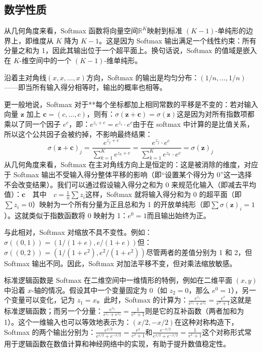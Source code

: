\subsection{数学性质}
从几何角度来看，Softmax 函数将向量空间$\mathbb{R}^K$映射到标准 $(K - 1)$-单纯形的边界上，即维度从 $K$ 降为 $K - 1$。这是因为 Softmax 输出满足一个线性约束：所有分量之和为 1，因此其输出位于一个超平面上。换句话说，Softmax 的值域是嵌入在 $K$-维空间中的一个 $(K - 1)$-维单纯形。

沿着主对角线$(x, x, \dots, x)$方向，Softmax 的输出是均匀分布：$(1/n, \dots, 1/n)$——即当所有输入得分相等时，输出的概率也相等。

更一般地说，Softmax 对于**每个坐标都加上相同常数的平移是不变的：若对输入向量 $\mathbf{z}$ 加上 $\mathbf{c} = (c, \dots, c)$，则有：$\sigma(\mathbf{z} + \mathbf{c}) = \sigma(\mathbf{z})$这是因为对所有指数项都乘以了同一个因子 $e^c$，即：$e^{z_i + c} = e^{z_i} \cdot e^c$由于在 softmax 中计算的是比值关系，所以这个公共因子会被约掉，不影响最终结果：
$$
\sigma(\mathbf{z} + \mathbf{c})_j = \frac{e^{z_j + c}}{\sum_{k=1}^{K} e^{z_k + c}} = \frac{e^{z_j} \cdot e^c}{\sum_{k=1}^{K} e^{z_k} \cdot e^c} = \sigma(\mathbf{z})_j~
$$
从几何角度来看，Softmax 在主对角线方向上是恒定的：这是被消除的维度，对应于 Softmax 输出不受输入得分整体平移的影响（即“设置某个得分为 0”这一选择不会改变结果）。我们可以通过假设输入得分之和为 0 来规范化输入（即减去平均值）：$\mathbf{c} \quad \text{其中} \quad c = \frac{1}{n} \sum z_i$这样，Softmax 就将输入得分和为 0 的超平面（即$\sum z_i = 0$）映射为一个所有分量为正且总和为 1 的开放单纯形（即$\sum \sigma(\mathbf{z})_i = 1$）。这就类似于指数函数将 0 映射为 1：$e^0 = 1$而且输出始终为正。

与此相对，Softmax 对缩放不具不变性。例如：$\sigma((0, 1)) = \left( 1/(1 + e), e/(1 + e) \right)$但：$\sigma((0, 2)) = \left( 1/(1 + e^2), e^2/(1 + e^2) \right)$尽管两者的差值分别为 1 和 2，但 Softmax 输出不同。因此，Softmax 对加法平移不变，但对乘法缩放敏感。

标准逻辑函数是 Softmax 在二维空间中一维情形的特例，例如在二维平面 $(x, y)$ 中沿着 $x$-轴的情况。假设其中一个变量固定为 0（如 $z_2 = 0$，那么 $e^0 = 1$），另一个变量可以变化，记为 $z_1 = x$。此时，Softmax 的计算为：$\frac{e^{z_1}}{e^{z_1} + e^{z_2}} = \frac{e^x}{e^x + 1}$这就是标准逻辑函数；而另一个分量：$
\frac{e^{z_2}}{e^{z_1} + e^{z_2}} = \frac{1}{e^x + 1}$则是它的互补函数（两者加和为 1）。这个一维输入也可以等效地表示为：$(x/2, -x/2)$在这种对称构造下，Softmax 的两个输出分别为：$\frac{e^{x/2}}{e^{x/2} + e^{-x/2}} = \frac{e^x}{e^x + 1}$和$\frac{e^{-x/2}}{e^{x/2} + e^{-x/2}} = \frac{1}{e^x + 1}$这个对称形式常用于逻辑函数在数值计算和神经网络中的实现，有助于提升数值稳定性。
